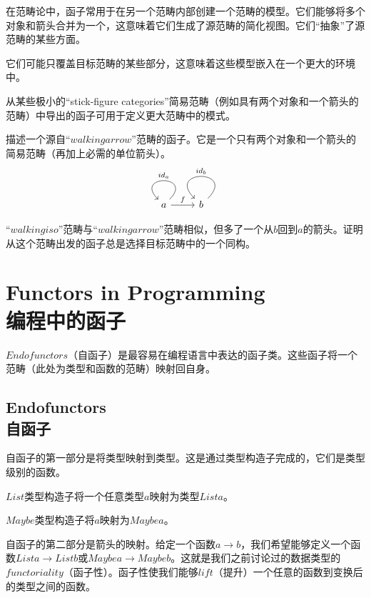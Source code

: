 \documentclass[DaoFP]{subfiles}
\begin{document}
    在范畴论中，函子常用于在另一个范畴内部创建一个范畴的模型。它们能够将多个对象和箭头合并为一个，这意味着它们生成了源范畴的简化视图。它们“抽象”了源范畴的某些方面。

    它们可能只覆盖目标范畴的某些部分，这意味着这些模型嵌入在一个更大的环境中。

    从某些极小的“stick-figure categories”简易范畴（例如具有两个对象和一个箭头的范畴）中导出的函子可用于定义更大范畴中的模式。

    \begin{exercise}
        描述一个源自“$walking arrow$”范畴的函子。它是一个只有两个对象和一个箭头的简易范畴（再加上必需的单位箭头）。
        \[
            \begin{tikzcd}
                a
                \arrow[loop,  "id_{a}"']
                \arrow[r, "f"]
                & b
                \arrow[loop, "id_{b}"']
            \end{tikzcd}
        \]
    \end{exercise}

    \begin{exercise}
        “$walking iso$”范畴与“$walking arrow$”范畴相似，但多了一个从$b$回到$a$的箭头。证明从这个范畴出发的函子总是选择目标范畴中的一个同构。
    \end{exercise}

    \section{Functors in Programming\\编程中的函子}

    $Endofunctors$（自函子）是最容易在编程语言中表达的函子类。这些函子将一个范畴（此处为类型和函数的范畴）映射回自身。

    \subsection{Endofunctors\\自函子}

    自函子的第一部分是将类型映射到类型。这是通过类型构造子完成的，它们是类型级别的函数。

    $List$类型构造子将一个任意类型$a$映射为类型$List a$。

    $Maybe$类型构造子将$a$映射为$Maybe a$。

    自函子的第二部分是箭头的映射。给定一个函数$a \to b$，我们希望能够定义一个函数$List a \to List b$或$Maybe a \to Maybe b$。这就是我们之前讨论过的数据类型的$functoriality$（函子性）。函子性使我们能够$lift$（提升）一个任意的函数到变换后的类型之间的函数。
\end{document}
